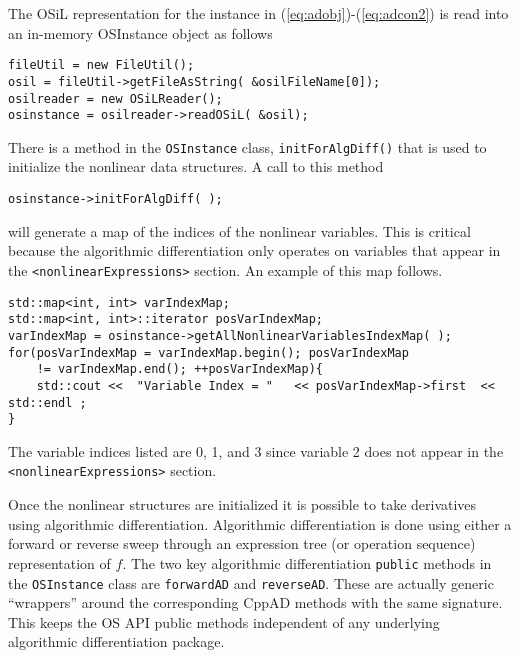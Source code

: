 \documentclass[11pt]{article}
\renewcommand{\_}{{\char"5F}}
\renewcommand{\{}{{\char"7B}}
\renewcommand{\}}{{\char"7D}}
\renewcommand{\^}{{\char"0D}}
\renewcommand{\'}{{\char"0D}}
\begin{document}
The OSiL representation for the instance  in  (\ref{eq:adobj})-(\ref{eq:adcon2})  is read into an in-memory OSInstance object as follows
\begin{verbatim}
fileUtil = new FileUtil();
osil = fileUtil->getFileAsString( &osilFileName[0]);
osilreader = new OSiLReader();
osinstance = osilreader->readOSiL( &osil);
\end{verbatim} 
There is a method in the {\tt OSInstance} class, {\tt initForAlgDiff()} that is used to initialize the nonlinear data structures.  A call to this method
\begin{verbatim}
osinstance->initForAlgDiff( );
\end{verbatim}  
will generate a map of the indices of the nonlinear variables. This is critical because the algorithmic differentiation only operates on variables that appear in the {\tt <nonlinearExpressions>} section.  An example of this map follows.
\begin{verbatim}
std::map<int, int> varIndexMap;
std::map<int, int>::iterator posVarIndexMap;
varIndexMap = osinstance->getAllNonlinearVariablesIndexMap( );
for(posVarIndexMap = varIndexMap.begin(); posVarIndexMap 
	!= varIndexMap.end(); ++posVarIndexMap){
	std::cout <<  "Variable Index = "   << posVarIndexMap->first  << std::endl ;
}
\end{verbatim}
The variable indices listed are 0, 1, and 3 since variable 2 does not appear in the {\tt <nonlinearExpressions>} section. 

Once the nonlinear structures are initialized it is possible to take derivatives using algorithmic differentiation.   Algorithmic differentiation is done using either a forward or reverse sweep through an expression tree (or operation sequence) representation of $f$.  The two key algorithmic differentiation {\tt public} methods in the {\tt OSInstance} class are {\tt forwardAD} and {\tt reverseAD}.   These are actually  generic ``wrappers'' around the corresponding CppAD methods with the same signature.  This keeps the OS API  public methods independent of any underlying algorithmic differentiation package. 
\end{document}
